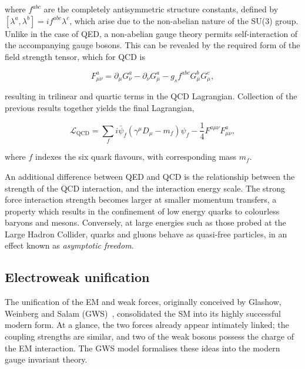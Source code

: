\noindent where $f^{abc}$ are the completely antisymmetric structure constants, defined by $\left[ \lambda^{a},\lambda^{b} \right] = if^{abc}\lambda^{c}$, which arise due to the non-abelian nature of the SU(3) group. Unlike in the case of QED, a non-abelian gauge theory permits self-interaction of the accompanying gauge bosons. This can be revealed by the required form of the field strength tensor, which for QCD is

\begin{equation}
      F^{a}_{\mu\nu} = \partial_{\mu}G_{\nu}^{a} - \partial_{\nu}G_{\mu}^{a} - g_{s}f^{abc}G^{b}_{\mu}G^{c}_{\mu}, 
\end{equation}

\noindent resulting in trilinear and quartic terms in the QCD Lagrangian. Collection of the previous results together yields the final Lagrangian,

\begin{equation}
    \mathcal{L_{\mathrm{QCD}}} = \sum_{f} i\bar{\psi}_{f}(\gamma^{\mu}D_{\mu} - m_{f})\psi_{f} - \frac{1}{4}F^{a\mu\nu}F_{\mu\nu}^{a},
\end{equation}

\noindent where $f$ indexes the six quark flavours, with corresponding mass $m_{f}$. %

An additional difference between QED and QCD is the relationship between the strength of the QCD interaction, and the interaction energy scale. The strong force interaction strength becomes larger at smaller momentum transfers, a property which results in the confinement of low energy quarks to colourless baryons and mesons. Conversely, at large energies such as those probed at the Large Hadron Collider, quarks and gluons behave as quasi-free particles, in an effect known as \textit{asymptotic freedom}.




\subsection{Electroweak unification}

The unification of the EM and weak forces, originally conceived by Glashow, Weinberg and Salam (GWS)~\cite{Glashow,Weinberg,Salam}, consolidated the SM into its highly successful modern form. At a glance, the two forces already appear intimately linked; the coupling strengths are similar, and two of the weak bosons possess the charge of the EM interaction. The GWS model formalises these ideas into the modern gauge invariant theory.

